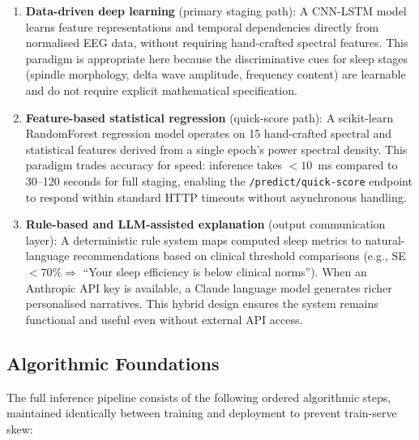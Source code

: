 \documentclass[10pt]{article}
\begin{document}
\begin{enumerate}
  \item \textbf{Data-driven deep learning} (primary staging path): A CNN-LSTM model learns feature representations and temporal dependencies directly from normalised EEG data, without requiring hand-crafted spectral features. This paradigm is appropriate here because the discriminative cues for sleep stages (spindle morphology, delta wave amplitude, frequency content) are learnable and do not require explicit mathematical specification.

  \item \textbf{Feature-based statistical regression} (quick-score path): A scikit-learn RandomForest regression model operates on 15 hand-crafted spectral and statistical features derived from a single epoch's power spectral density. This paradigm trades accuracy for speed: inference takes $<10$~ms compared to 30--120 seconds for full staging, enabling the \texttt{/predict/quick-score} endpoint to respond within standard HTTP timeouts without asynchronous handling.

  \item \textbf{Rule-based and LLM-assisted explanation} (output communication layer): A deterministic rule system maps computed sleep metrics to natural-language recommendations based on clinical threshold comparisons (e.g., SE~$< 70\% \Rightarrow$ ``Your sleep efficiency is below clinical norms''). When an Anthropic API key is available, a Claude language model generates richer personalised narratives. This hybrid design ensures the system remains functional and useful even without external API access.
\end{enumerate}

\subsection{Algorithmic Foundations}
\label{sec:algoFoundations}

The full inference pipeline consists of the following ordered algorithmic steps, maintained identically between training and deployment to prevent train-serve skew:
\end{document}
